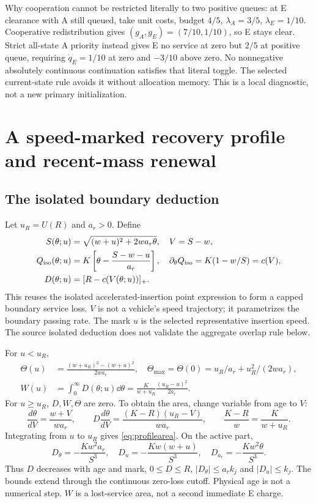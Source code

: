 Why cooperation cannot be restricted literally to two positive queues:
at E clearance with A still queued, take unit costs, budget $4/5$,
$\lambda_A=3/5$, $\lambda_E=1/10$. Cooperative redistribution gives
$(g_A,g_E)=(7/10,1/10)$, so E stays clear. Strict all-state A priority
instead gives E no service at zero but $2/5$ at positive queue, requiring
$\dot q_E=1/10$ at zero and $-3/10$ above zero. No nonnegative absolutely
continuous continuation satisfies that literal toggle. The selected
current-state rule avoids it without allocation memory. This is a local
diagnostic, not a new primary initialization.

\section{A speed-marked recovery profile and recent-mass renewal}
\label{sec:recovery}
\subsection{The isolated boundary deduction}
Let $u_R=U(R)$ and $a_r>0$. Define
\begin{align}
 S(\theta;u)&=\sqrt{(w+u)^2+2wa_r\theta},\quad V=S-w,\nonumber\\
 Q_{\rm iso}(\theta;u)&=K\left[\theta-
                  \frac{S-w-u}{a_r}\right],\quad
 \partial_\theta Q_{\rm iso}=K(1-w/S)=c(V),\nonumber\\
 D(\theta;u)&=[R-c(V(\theta;u))]_+. \label{eq:profile}
\end{align}
This reuses the isolated accelerated-insertion point expression to form
a capped boundary service loss. $V$ is not a vehicle's speed trajectory;
it parametrizes the boundary passing rate. The mark $u$ is the selected
representative insertion speed. The source isolated deduction does not
validate the aggregate overlap rule below.

For $u<u_R$,
\begin{align}
 \Theta(u)&=\frac{(w+u_R)^2-(w+u)^2}{2wa_r},\quad
 \Theta_{\max}=\Theta(0)=u_R/a_r+u_R^2/(2wa_r),\nonumber\\
 W(u)&=\int_0^\infty D(\theta;u)\dd\theta
 =\frac{K}{w+u_R}\frac{(u_R-u)^2}{2a_r}. \label{eq:profilearea}
\end{align}
For $u\geq u_R$, $D,W,\Theta$ are zero. To obtain the area, change
variable from age to $V$:
\begin{equation}
 \frac{d\theta}{dV}=\frac{w+V}{wa_r},\qquad
 D\frac{d\theta}{dV}=\frac{(K-R)(u_R-V)}{wa_r},
 \qquad \frac{K-R}{w}=\frac{K}{w+u_R}.
 \label{eq:areaderiv}
\end{equation}
Integrating from $u$ to $u_R$ gives \eqref{eq:profilearea}. On the active
part,
\begin{equation}
 D_\theta=-\frac{Kw^2a_r}{S^3},\quad
 D_u=-\frac{Kw(w+u)}{S^3},\quad
 D_{a_r}=-\frac{Kw^2\theta}{S^3}. \label{eq:profilederivs}
\end{equation}
Thus $D$ decreases with age and mark, $0\leq D\leq R$,
$|D_\theta|\leq a_rk_j$ and $|D_u|\leq k_j$. The bounds extend
through the continuous zero-loss cutoff. Physical age is not a numerical
step. $W$ is a lost-service area, not a second immediate E charge.

